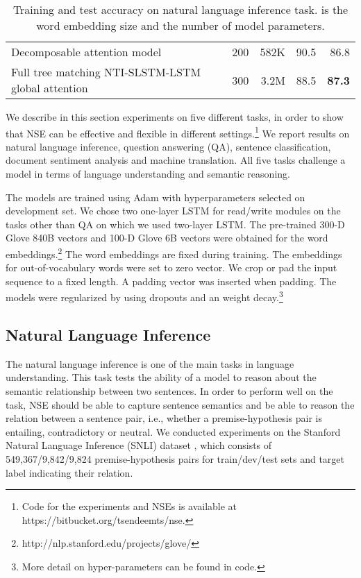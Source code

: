 \documentclass{article}
\begin{document}
\begin{table*}[t]
\begin{center}
\begin{tabular}{c|c|c|c|c}
\multicolumn{1}{l|}{Decomposable attention model \cite{parikh2016decomposable}} & \multicolumn{1}{|r|}{200} & \multicolumn{1}{|r|}{582K} & \multicolumn{1}{|r|}{90.5} & \multicolumn{1}{|r}{86.8} \\
\multicolumn{1}{l|}{Full tree matching NTI-SLSTM-LSTM global attention \cite{munkhdalai2016neural}} & \multicolumn{1}{|r|}{300} & \multicolumn{1}{|r|}{3.2M} & \multicolumn{1}{|r|}{88.5} & \multicolumn{1}{|r}{\textbf{87.3}} \\
\hline
\end{tabular}
\end{center}
\caption{\label{table:snli}Training and test accuracy on natural language inference task.  is the word embedding size and  the number of model parameters.}
\end{table*}

We describe in this section experiments on five different tasks, in order to show that NSE can be effective and flexible in different settings.\footnote{Code for the experiments and NSEs is available at https://bitbucket.org/tsendeemts/nse.} We report results on natural language inference, question answering (QA), sentence classification, document sentiment analysis and machine translation. All five tasks challenge a model in terms of language understanding and semantic reasoning. 

The models are trained using Adam \cite{kingma:14} with hyperparameters selected on development set. We chose two one-layer LSTM for read/write modules on the tasks other than QA on which we used two-layer LSTM. The pre-trained 300-D Glove 840B vectors and 100-D Glove 6B vectors \cite{pennington:14} were obtained for the word embeddings.\footnote{http://nlp.stanford.edu/projects/glove/} The word embeddings are fixed during training. The embeddings for out-of-vocabulary words were set to zero vector. We crop or pad the input sequence to a fixed length. A padding vector was inserted when padding. The models were regularized by using dropouts and an  weight decay.\footnote{More detail on hyper-parameters can be found in code.}

\subsection{Natural Language Inference}

The natural language inference is one of the main tasks in language understanding. This task tests the ability of a model to reason about the semantic relationship between two sentences. In order to perform well on the task, NSE should be able to capture sentence semantics and be able to reason the relation between a sentence pair, i.e., whether a premise-hypothesis pair is entailing, contradictory or neutral. We conducted experiments on the Stanford Natural Language Inference (SNLI) dataset \cite{bowman:15}, which consists of 549,367/9,842/9,824 premise-hypothesis pairs for train/dev/test sets and target label indicating their relation. 
\end{document}

